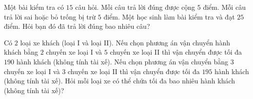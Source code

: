 \begin{bt}%
Một bài kiểm tra có $15$ câu hỏi. Mỗi câu trả lời đúng được cộng $5$ điểm. Mỗi câu trả lời sai hoặc bỏ trống bị trừ $5$ điểm. Một học sinh làm bài kiểm tra và đạt $25$ điểm. Hỏi bạn đó đã trả lời đúng bao nhiêu câu?
\end{bt}

\begin{bt}%
Có $2$ loại xe khách (loại I và loại II). Nếu chọn phương án vận chuyển hành khách bằng $2$ chuyến xe loại I và $5$ chuyến xe loại II thì vận chuyển được tối đa $190$ hành khách (không tính tài xế). Nếu chọn phương án vận chuyển bằng $3$ chuyến xe loại I và $3$ chuyến xe loại II thì vận chuyển được tối đa $195$ hành khách (không tính tài xế). Hỏi mỗi loại xe có thể chứa tối đa bao nhiêu hành khách (không tính tài xế)?
\end{bt}

